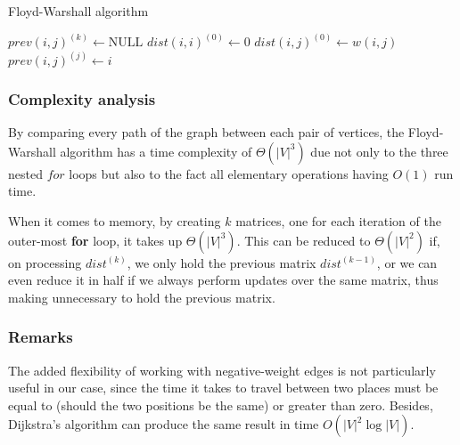 \begin{algorithm}[ht]
    \caption{Floyd-Warshall algorithm}
    \label{alg:floyd-warshall}
    \begin{algorithmic}[1]
             
                 {$prev(i,j)^{(k)} \gets \text{NULL}$}
                \EndFor
            \EndFor
             $dist(i,i)^{(0)} \gets 0$
            \EndFor
             
                \State $dist(i,j)^{(0)} \gets w(i,j)$
                \State $prev(i,j)^{(j)} \gets i$
            \EndFor
             
                    \EndIf
                \EndFor
            \EndFor
            \State {}
        \EndFunction
    \end{algorithmic}
\end{algorithm}

\subsubsection{Complexity analysis}
By comparing every path of the graph between each pair of vertices, the Floyd-Warshall algorithm has a time complexity of $\Theta(|V|^3)$ due not only to the three nested $for$ loops but also to the fact all elementary operations having $O(1)$ run time.\par
When it comes to memory, by creating $k$ matrices, one for each iteration of the outer-most \textbf{for} loop, it takes up $\Theta(|V|^3)$. This can be reduced to $\Theta(|V|^2)$ if, on processing $dist^{(k)}$, we only hold the previous matrix $dist^{(k-1)}$, or we can even reduce it in half if we always perform updates over the same matrix, thus making unnecessary to hold the previous matrix.

\subsubsection{Remarks}
The added flexibility of working with negative-weight edges is not particularly useful in our case, since the time it takes to travel between two places must be equal to (should the two positions be the same) or greater than zero. Besides, Dijkstra's algorithm can produce the same result in time $O(|V|^2 \log {|V|})$.